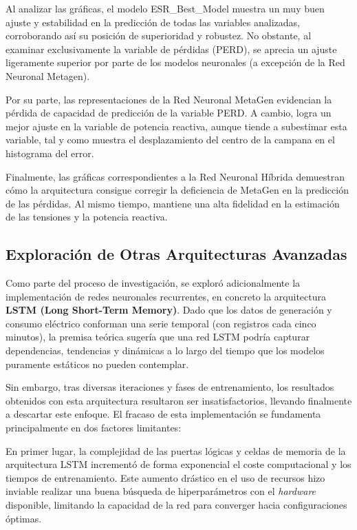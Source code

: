 Al analizar las gráficas, el modelo ESR\_Best\_Model muestra un muy buen ajuste y estabilidad en la predicción de todas las variables analizadas, corroborando así su posición de superioridad y robustez. No obstante, al examinar exclusivamente la variable de pérdidas (PERD), se aprecia un ajuste ligeramente superior por parte de los modelos neuronales (a excepción de la Red Neuronal Metagen).

Por su parte, las representaciones de la Red Neuronal MetaGen evidencian la pérdida de capacidad de predicción de la variable PERD. A cambio, logra un mejor ajuste en la variable de potencia reactiva, aunque tiende a subestimar esta variable, tal y como muestra el desplazamiento del centro de la campana en el histograma del error.

Finalmente, las gráficas correspondientes a la Red Neuronal Híbrida demuestran cómo la arquitectura consigue corregir la deficiencia de MetaGen en la predicción de las pérdidas. Al mismo tiempo, mantiene una alta fidelidad en la estimación de las tensiones y la potencia reactiva.

\subsection{Exploración de Otras Arquitecturas Avanzadas}
Como parte del proceso de investigación, se exploró adicionalmente la implementación de redes neuronales recurrentes, en concreto la arquitectura \textbf{LSTM (Long Short-Term Memory)}. Dado que los datos de generación y consumo eléctrico conforman una serie temporal (con registros cada cinco minutos), la premisa teórica sugería que una red LSTM podría capturar dependencias, tendencias y dinámicas a lo largo del tiempo que los modelos puramente estáticos no pueden contemplar.

Sin embargo, tras diversas iteraciones y fases de entrenamiento, los resultados obtenidos con esta arquitectura resultaron ser insatisfactorios, llevando finalmente a descartar este enfoque. El fracaso de esta implementación se fundamenta principalmente en dos factores limitantes:

En primer lugar, la complejidad de las puertas lógicas y celdas de memoria de la arquitectura LSTM incrementó de forma exponencial el coste computacional y los tiempos de entrenamiento. Este aumento drástico en el uso de recursos hizo inviable realizar una buena búsqueda de hiperparámetros con el \textit{hardware} disponible, limitando la capacidad de la red para converger hacia configuraciones óptimas.

